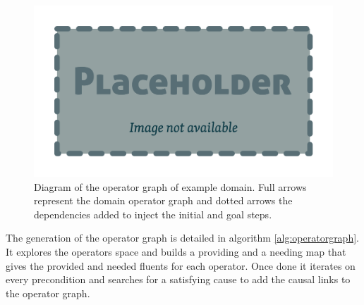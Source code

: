 \documentclass[11pt,a4paper,twoside,openright,titlepage,numbers=noenddot,headinclude,cleardoublepage=empty,openany]{scrreprt}
\theoremstyle{plain}
\theoremstyle{definition}
\theoremstyle{remark}
\begin{document}
\begin{figure}
\hypertarget{fig:operatorgraph}{%
\centering
\includegraphics{./tex2pdf.-0b80fea6fd6da7f9/85c5abcb21612ede4db12ac6fcfd32ed24ed57eb.pdf}
\caption{Diagram of the operator graph of example domain. Full arrows
represent the domain operator graph and dotted arrows the dependencies
added to inject the initial and goal steps.}\label{fig:operatorgraph}
}
\end{figure}

The generation of the operator graph is detailed in
algorithm \ref{alg:operatorgraph}. It explores the operators space and
builds a providing and a needing map that gives the provided and needed
fluents for each operator. Once done it iterates on every precondition
and searches for a satisfying cause to add the causal links to the
operator graph.

\end{document}
